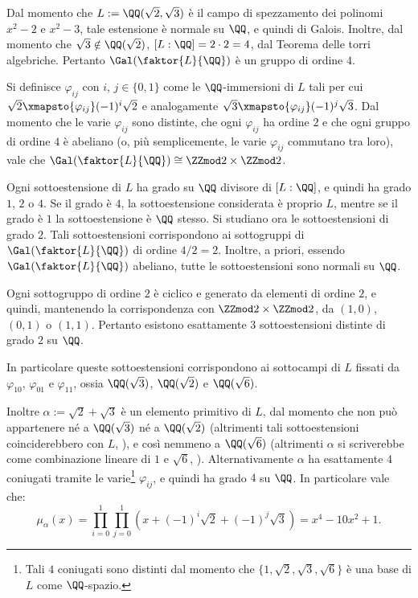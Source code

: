 \documentclass[12pt]{scrartcl}
\begin{document}
	\begin{example}
		Dal momento che $L := \QQ(\sqrt{2}, \sqrt{3})$ è
		il campo di spezzamento dei polinomi $x^2 - 2$
		e $x^2 - 3$, tale estensione è normale su $\QQ$,
		e quindi di Galois. Inoltre, dal momento che
		$\sqrt{3} \notin \QQ(\sqrt{2})$,
		$[L : \QQ] = 2 \cdot 2 = 4$, dal Teorema delle
		torri algebriche. Pertanto $\Gal(\faktor{L}{\QQ})$
		è un gruppo di ordine $4$. \medskip
		
		
		Si definisce $\varphi_{ij}$ con $i$, $j \in \{0, 1\}$
		come le $\QQ$-immersioni di $L$
		tali per cui $\sqrt{2} \xmapsto{\varphi_{ij}} (-1)^i \sqrt{2}$ e analogamente $\sqrt{3} \xmapsto{\varphi_{ij}} (-1)^j \sqrt{3}$. Dal momento
		che le varie $\varphi_{ij}$ sono distinte,
		che ogni $\varphi_{ij}$ ha ordine $2$ e che ogni
		gruppo di ordine $4$ è abeliano (o, più semplicemente,
		le varie $\varphi_{ij}$ commutano tra loro),
		vale che $\Gal(\faktor{L}{\QQ}) \cong \ZZmod2 \times \ZZmod2$. \medskip
		
		
		Ogni sottoestensione di $L$ ha
		grado su $\QQ$ divisore di $[L : \QQ]$, e quindi
		ha grado $1$, $2$ o $4$. Se il grado è $4$,
		la sottoestensione considerata è proprio $L$, mentre
		se il grado è $1$ la sottoestensione è $\QQ$ stesso.
		Si studiano ora le sottoestensioni di grado $2$.
		Tali sottoestensioni corrispondono ai sottogruppi
		di $\Gal(\faktor{L}{\QQ})$ di ordine $4/2 = 2$. Inoltre,
		a priori, essendo $\Gal(\faktor{L}{\QQ})$ abeliano, tutte
		le sottoestensioni sono normali su $\QQ$. \medskip
		
		
		Ogni sottogruppo di ordine $2$ è ciclico e generato
		da elementi di ordine $2$, e quindi, mantenendo
		la corrispondenza con $\ZZmod2 \times \ZZmod2$,
		da $(1,0)$, $(0,1)$ o $(1,1)$. Pertanto esistono
		esattamente $3$ sottoestensioni distinte di grado $2$
		su $\QQ$. \medskip
		
		
		In particolare queste sottoestensioni corrispondono
		ai sottocampi di $L$ fissati da $\varphi_{10}$,
		$\varphi_{01}$ e $\varphi_{11}$, ossia
		$\QQ(\sqrt{3})$, $\QQ(\sqrt{2})$ e $\QQ(\sqrt{6})$. \medskip
		
		
		Inoltre $\alpha := \sqrt{2} + \sqrt{3}$ è un elemento primitivo
		di $L$, dal momento che non può appartenere né a
		$\QQ(\sqrt{3})$ né a $\QQ(\sqrt{2})$ (altrimenti
		tali sottoestensioni coinciderebbero con $L$, \Lightning), e così nemmeno a $\QQ(\sqrt{6})$ (altrimenti $\alpha$ si scriverebbe
		come combinazione lineare di $1$ e $\sqrt{6}$,
		\Lightning). Alternativamente $\alpha$
		ha esattamente $4$ coniugati tramite
		le varie\footnote{
			Tali $4$ coniugati sono distinti dal momento
			che $\{1, \sqrt{2}, \sqrt{3}, \sqrt{6}\}$ è
			una base di $L$ come $\QQ$-spazio.
		} $\varphi_{ij}$, e quindi ha grado $4$ su
		$\QQ$. In particolare vale che:
		\[ \mu_\alpha(x) = \prod_{i=0}^1 \prod_{j=0}^1 (x + (-1)^i \sqrt{2} + (-1)^j \sqrt{3}) = x^4 - 10x^2 + 1. \]
		

\end{example}
\end{document}

